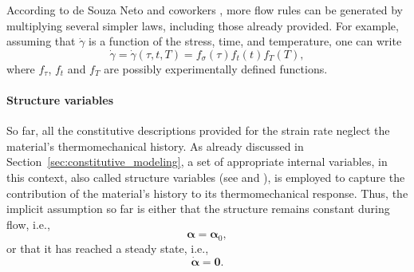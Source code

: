According to de Souza Neto and coworkers \citep{desouzanetoComputationalMethodsPlasticity2008}, more flow rules can be generated by multiplying several simpler laws, including those already provided.
For example, assuming that $\dot \gamma$ is a function of the stress, time, and temperature, one can write
\begin{equation}
	\dot \gamma = \dot \gamma(\tau, t, T) = f_\sigma (\tau) f_t(t) f_T(T),
\end{equation}
where $f_\tau$, $f_t$ and $f_T$ are possibly experimentally defined functions.


\paragraph{Structure variables}
So far, all the constitutive descriptions provided for the strain rate neglect the material's thermomechanical history.
As already discussed in Section~\ref{sec:constitutive_modeling}, a set of appropriate internal variables, in this context, also called structure variables (see \cite{kocks1975thermodynamics} and \cite{frostDeformationmechanismMapsPlasticity1982}), is employed to capture the contribution of the material's history to its thermomechanical response.
Thus, the implicit assumption so far is either that the structure remains constant during flow, i.e.,
\begin{equation}
  \bm \alpha = \bm \alpha_0,
\end{equation}
or that it has reached a steady state, i.e.,
\begin{equation}
  \dot{\bm \alpha} = \bm 0.
\end{equation}

